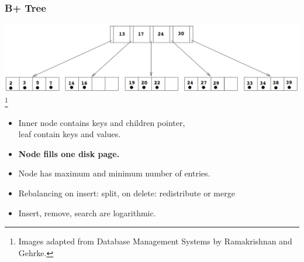 \documentclass{beamer}
\newcommand\blfootnote[1]{%
  \begingroup
  \renewcommand\thefootnote{}\footnote{#1}%
  \addtocounter{footnote}{-1}%
  \endgroup
}
\begin{document}
    \begin{frame}
      \frametitle{B+ Tree}
      \vspace{-1em}
      \includegraphics[scale=0.2]{B+Tree.png}
      \blfootnote{\tiny Images adapted from Database Management Systems by Ramakrishnan and Gehrke.}
      \vspace{2em}
      \begin{itemize}
        \item Inner node contains keys and children pointer, \\leaf contain keys and values.
        \item \textbf{Node fills one disk page.}
        \item Node has maximum and minimum number of entries.
        \pause
        \item Rebalancing on insert: split, on delete: redistribute or merge
        \pause
        \item Insert, remove, search are logarithmic.
      \end{itemize}
    \end{frame}
\end{document}
